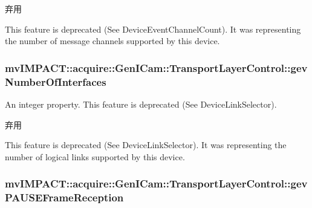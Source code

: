 \begin{DoxyRefDesc}{弃用}
\item[\hyperlink{deprecated__deprecated000068}{弃用}]This feature is deprecated (See Device\+Event\+Channel\+Count). It was representing the number of message channels supported by this device. \end{DoxyRefDesc}
\hypertarget{classmv_i_m_p_a_c_t_1_1acquire_1_1_gen_i_cam_1_1_transport_layer_control_ace62c05c2965a8a3d57157051b0f3174}{
\subsubsection[{gev\+Number\+Of\+Interfaces}]{ mv\+I\+M\+P\+A\+C\+T\+::acquire\+::\+Gen\+I\+Cam\+::\+Transport\+Layer\+Control\+::gev\+Number\+Of\+Interfaces}}\label{classmv_i_m_p_a_c_t_1_1acquire_1_1_gen_i_cam_1_1_transport_layer_control_ace62c05c2965a8a3d57157051b0f3174}


An integer property. This feature is deprecated (See Device\+Link\+Selector). 

\begin{DoxyRefDesc}{弃用}
\item[\hyperlink{deprecated__deprecated000067}{弃用}]This feature is deprecated (See Device\+Link\+Selector). It was representing the number of logical links supported by this device. \end{DoxyRefDesc}
\hypertarget{classmv_i_m_p_a_c_t_1_1acquire_1_1_gen_i_cam_1_1_transport_layer_control_ac76f66b80f142449a226185307e344fd}{
\subsubsection[{gev\+P\+A\+U\+S\+E\+Frame\+Reception}]{ mv\+I\+M\+P\+A\+C\+T\+::acquire\+::\+Gen\+I\+Cam\+::\+Transport\+Layer\+Control\+::gev\+P\+A\+U\+S\+E\+Frame\+Reception}}\label{classmv_i_m_p_a_c_t_1_1acquire_1_1_gen_i_cam_1_1_transport_layer_control_ac76f66b80f142449a226185307e344fd}


